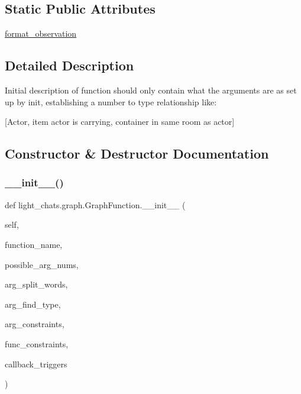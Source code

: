\subsection*{Static Public Attributes}
\begin{DoxyCompactItemize}
\item 
\hyperlink{classlight__chats_1_1graph_1_1GraphFunction_a40c1214e286a5c8ca375aae48bf36d89}{format\+\_\+observation}
\end{DoxyCompactItemize}


\subsection{Detailed Description}
\begin{DoxyVerb}Initial description of function should only contain what the arguments are as set up
by init, establishing a number to type relationship like:

[Actor, item actor is carrying, container in same room as actor]
\end{DoxyVerb}
 

\subsection{Constructor \& Destructor Documentation}
\mbox{\label{classlight__chats_1_1graph_1_1GraphFunction_afcb6dd9e771c4db34f5af22588e6190e}} 
\subsubsection{\texorpdfstring{\+\_\+\+\_\+init\+\_\+\+\_\+()}{\_\_init\_\_()}}
{\footnotesize\ttfamily def light\+\_\+chats.\+graph.\+Graph\+Function.\+\_\+\+\_\+init\+\_\+\+\_\+ (\begin{DoxyParamCaption}\item[{}]{self,  }\item[{}]{function\+\_\+name,  }\item[{}]{possible\+\_\+arg\+\_\+nums,  }\item[{}]{arg\+\_\+split\+\_\+words,  }\item[{}]{arg\+\_\+find\+\_\+type,  }\item[{}]{arg\+\_\+constraints,  }\item[{}]{func\+\_\+constraints,  }\item[{}]{callback\+\_\+triggers }\end{DoxyParamCaption})}

